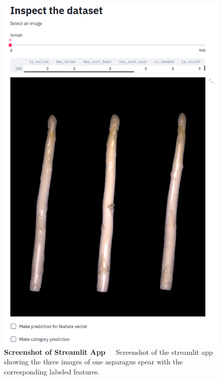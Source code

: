 \begin{figure}[!htb]
    \centering
    \includegraphics[scale=0.4]{Figures/chapter04/ftl_streamlit_app.png}
    \decoRule
    \caption[Screenshot of the Streamlit App]{\textbf{Screenshot of Streamlit App}~~~Screenshot of the streamlit app showing the three images of one asparagus spear with the corresponding labeled features.}
   \label{fig:FeaturetoLabelStreamlitApp}
\end{figure}   

